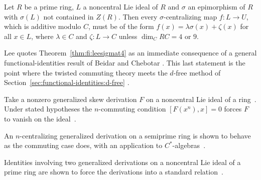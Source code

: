 \begin{theorem}\label{thm:fi:leesigmat4}
Let $R$ be a prime ring, $L$ a noncentral Lie ideal of $R$ and $\sigma$ an
epimorphism of $R$ with $\sigma(L)$ not contained in $Z(R)$. Then every
$\sigma$-centralizing map $f\colon L\to U$, which is additive modulo $C$,
must be of the form $f(x)=\lambda\sigma(x)+\zeta(x)$ for all $x\in L$,
where $\lambda\in C$ and $\zeta\colon L\to C$ unless $\dim_C RC=4$ or $9$.
\end{theorem}

Lee quotes Theorem~\ref{thm:fi:leesigmat4} as an immediate consequence of
a general functional-identities result of Beidar and Chebotar
\cite[p.~2950]{LeeTK2001SigmaCommuting}. This last statement is the point
where the twisted commuting theory meets the $d$-free method of
Section~\ref{sec:functional-identities:d-free}
\cite[p.~2950]{LeeTK2001SigmaCommuting}.

Take a nonzero generalized skew derivation $F$ on a noncentral Lie ideal of a
ring~\cite{WlPrimeAndSemiprime2018}. Under stated hypotheses the $n$-commuting condition $[F(x^n),x]=0$ forces
$F$ to
vanish on the ideal~\cite{WlPrimeAndSemiprime2018}.

An $n$-centralizing generalized derivation on a semiprime ring is shown to
behave as the commuting case does, with an application to
$C^*$-algebras~\cite{WlOnN-centralizingGeneralize2012}.

Identities involving two generalized derivations on a noncentral Lie ideal of
a prime ring are shown to force the derivations into a standard
relation~\cite{WlIdentitiesWithGeneralized2012}.

